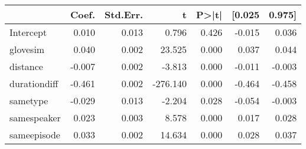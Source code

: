 \begin{tabular}{lrrrrrr}
\toprule
{} &  Coef. &  Std.Err. &        t &  P>|t| &  [0.025 &  0.975] \\
\midrule
Intercept    &  0.010 &     0.013 &    0.796 &  0.426 &  -0.015 &   0.036 \\
glovesim     &  0.040 &     0.002 &   23.525 &  0.000 &   0.037 &   0.044 \\
distance     & -0.007 &     0.002 &   -3.813 &  0.000 &  -0.011 &  -0.003 \\
durationdiff & -0.461 &     0.002 & -276.140 &  0.000 &  -0.464 &  -0.458 \\
sametype     & -0.029 &     0.013 &   -2.204 &  0.028 &  -0.054 &  -0.003 \\
samespeaker  &  0.023 &     0.003 &    8.578 &  0.000 &   0.017 &   0.028 \\
sameepisode  &  0.033 &     0.002 &   14.634 &  0.000 &   0.028 &   0.037 \\
\bottomrule
\end{tabular}

